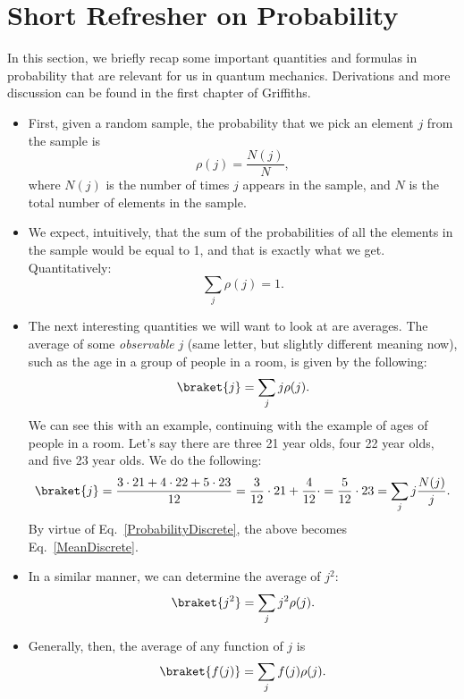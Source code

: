 \section{Short Refresher on Probability}

In this section, we briefly recap some important quantities and formulas in probability that are relevant for us in quantum mechanics. Derivations and more discussion can be found in the first chapter of Griffiths.

\begin{itemize}
    \item First, given a random sample, the probability that we pick an element $j$ from the sample is
        \begin{equation}
            \rho(j) = \frac{N(j)}{N},\label{ProbabilityDiscrete}
        \end{equation}
        where $N(j)$ is the number of times $j$ appears in the sample, and $N$ is the total number of elements in the sample.
    \item We expect, intuitively, that the sum of the probabilities of all the elements in the sample would be equal to 1, and that is exactly what we get. Quantitatively:
        \begin{equation}
            \sum_j \rho(j) = 1.
        \end{equation}
    \item The next interesting quantities we will want to look at are averages. The average of some \textit{observable} $j$ (same letter, but slightly different meaning now), such as the age in a group of people in a room, is given by the following:
        \begin{equation}
            \braket{j} = \sum_j j\rho(j).\label{MeanDiscrete}
        \end{equation}
        We can see this with an example, continuing with the example of ages of people in a room. Let's say there are three 21 year olds, four 22 year olds, and five 23 year olds. We do the following:
        \begin{equation*}
            \braket{j} = \frac{3\cdot21 + 4\cdot22 + 5\cdot23}{12} = \frac{3}{12}\cdot21 + \frac{4}{12}\cdot = \frac{5}{12}\cdot23 = \sum_j j\frac{N(j)}{j}.
        \end{equation*}
        By virtue of Eq.~\eqref{ProbabilityDiscrete}, the above becomes Eq.~\eqref{MeanDiscrete}.
    \item In a similar manner, we can determine the average of $j^2$:
        \begin{equation}
            \braket{j^2} = \sum_j j^2\rho(j).
        \end{equation}
    \item Generally, then, the average of any function of $j$ is
        \begin{equation}
            \braket{f(j)} = \sum_j f(j) \rho(j).
        \end{equation}
\end{itemize}


